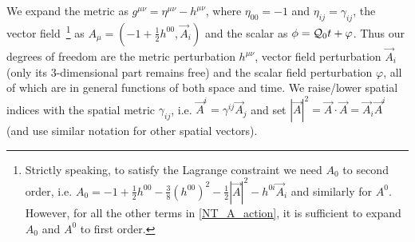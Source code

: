 \documentclass[twocolumn,prd,preprintnumbers,amsmath,amssymb,nofootinbib,superscriptaddress]{revtex4-1}
\newcommand{\Qcal}{{\cal Q}}
\begin{document}
We expand the metric as $g^{\mu\nu} = \eta^{\mu\nu} - h^{\mu\nu}$, where $\eta_{00} = -1$ and $\eta_{ij} = \gamma_{ij}$, the vector field~\footnote{
 Strictly speaking, to satisfy the Lagrange constraint we need $A_0$ to second order, i.e. $A_0 =  -1 + \frac{1}{2} h^{00}   - \frac{3}{8} (h^{00})^2 - \frac{1}{2} |\vec{A}|^2  -  h^{0i} \vec{A}_i$
and similarly for $A^0$. However, for all the other terms in \eqref{NT_A_action}, it is sufficient to expand $A_0$  and $A^0$ to first order. }
  as $A_\mu = ( -1 + \frac{1}{2} h^{00} , \vec{A}_i)$ and the scalar as $\phi = \Qcal_0 t + \varphi$. 
 Thus our degrees of freedom are the metric perturbation $h^{\mu\nu}$, vector field perturbation $\vec{A}_i$ (only its 3-dimensional part remains free) 
and the scalar field perturbation $\varphi$, all of which are in general functions of both space and time.
We raise/lower spatial indices with the spatial metric $\gamma_{ij}$, i.e. $\vec{A}^i = \gamma^{ij} \vec{A}_j$ and 
set $|\vec{A}|^2 = \vec{A} \cdot \vec{A} = \vec{A}_i \vec{A}^i$ (and use similar notation for other  spatial vectors).
\end{document}
